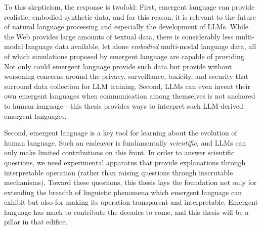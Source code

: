 To this skepticism, the response is twofold:
First, emergent language can provide realistic, embodied synthetic data, and for this reason, it is relevant to the future of natural language processing and especially the development of LLMs.
While the Web provides large amounts of textual data, there is considerably less multi-modal language data available, let alone \emph{embodied} multi-modal language data, all of which simulations proposed by emergent language are capable of providing.
Not only could emergent language provide such data but provide without worsening concerns around the privacy, surveillance, toxicity, and security that surround data collection for LLM training.
Second, LLMs can even invent their own emergent languages when communication among themselves is not anchored to human language---this thesis provides ways to interpret such LLM-derived emergent languages.





Second, emergent language is a key tool for learning about the evolution of human language.
Such an endeavor is fundamentally \emph{scientific}, and LLMs can only make limited contributions on this front.
In order to answer scientific questions, we need experimental apparatus that provide explanations through interpretable operation (rather than raising questions through inscrutable mechanisms).
Toward these questions, this thesis lays the foundation not only for extending the breadth of linguistic phenomena which emergent language can exhibit but also for making its operation transparent and interpretable.
Emergent language has much to contribute the decades to come, and this thesis will be a pillar in that edifice.

